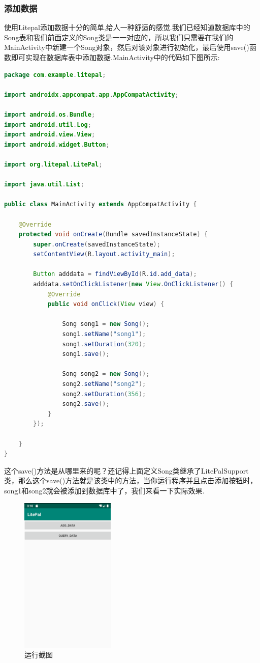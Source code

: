 \documentclass[cs4size,a4paper]{ctexart}
\numberwithin{equation}{section}
\numberwithin{table}{section}
\numberwithin{figure}{section}
\begin{document}
\subsubsection{添加数据}
使用Litepal添加数据十分的简单,给人一种舒适的感觉.我们已经知道数据库中的Song表和我们前面定义的Song类是一一对应的，所以我们只需要在我们的MainActivity中新建一个Song对象，然后对该对象进行初始化，最后使用save()函数即可实现在数据库表中添加数据.MainActivity中的代码如下图所示:
\begin{lstlisting}[language=java]
package com.example.litepal;

import androidx.appcompat.app.AppCompatActivity;

import android.os.Bundle;
import android.util.Log;
import android.view.View;
import android.widget.Button;

import org.litepal.LitePal;

import java.util.List;

public class MainActivity extends AppCompatActivity {

    @Override
    protected void onCreate(Bundle savedInstanceState) {
        super.onCreate(savedInstanceState);
        setContentView(R.layout.activity_main);

        Button adddata = findViewById(R.id.add_data);
        adddata.setOnClickListener(new View.OnClickListener() {
            @Override
            public void onClick(View view) {

                Song song1 = new Song();
                song1.setName("song1");
                song1.setDuration(320);
                song1.save();

                Song song2 = new Song();
                song2.setName("song2");
                song2.setDuration(356);
                song2.save();
            }
        });
      
    }
}
\end{lstlisting}
这个save()方法是从哪里来的呢？还记得上面定义Song类继承了LitePalSupport类，那么这个save()方法就是该类中的方法，当你运行程序并且点击添加按钮时，song1和song2就会被添加到数据库中了，我们来看一下实际效果.
\begin{figure}[H]
\small
\centering
\includegraphics[width=0.4\textwidth]{run}
\caption{运行截图} \label{运行截图}
\end{figure}
\end{document}
